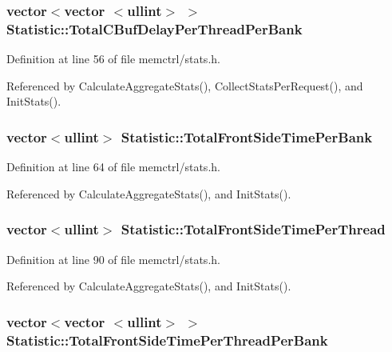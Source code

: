 \subsubsection[{TotalCBufDelayPerThreadPerBank}]{\setlength{\rightskip}{0pt plus 5cm}vector$<$vector $<${\bf ullint}$>$ $>$ {\bf Statistic::TotalCBufDelayPerThreadPerBank}}\label{classStatistic_b7024eea16c5b080c3792a23bdfeb1c9}




Definition at line 56 of file memctrl/stats.h.

Referenced by CalculateAggregateStats(), CollectStatsPerRequest(), and InitStats().
\subsubsection[{TotalFrontSideTimePerBank}]{\setlength{\rightskip}{0pt plus 5cm}vector$<${\bf ullint}$>$ {\bf Statistic::TotalFrontSideTimePerBank}}\label{classStatistic_9d8599db9c9709b04d4a22c733a5837b}




Definition at line 64 of file memctrl/stats.h.

Referenced by CalculateAggregateStats(), and InitStats().
\subsubsection[{TotalFrontSideTimePerThread}]{\setlength{\rightskip}{0pt plus 5cm}vector$<${\bf ullint}$>$ {\bf Statistic::TotalFrontSideTimePerThread}}\label{classStatistic_3bec072b196117521ef8b8e466634d50}




Definition at line 90 of file memctrl/stats.h.

Referenced by CalculateAggregateStats(), and InitStats().
\subsubsection[{TotalFrontSideTimePerThreadPerBank}]{\setlength{\rightskip}{0pt plus 5cm}vector$<$vector $<${\bf ullint}$>$ $>$ {\bf Statistic::TotalFrontSideTimePerThreadPerBank}}\label{classStatistic_76d35b31efcdef4ec015d4fee2ae1538}





